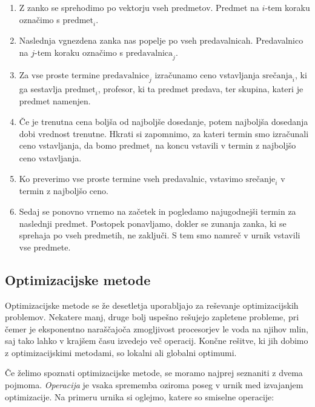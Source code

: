 \documentclass[a4paper,10pt]{article}
\begin{document}
\begin{enumerate}
  \item Z zanko se sprehodimo po vektorju vseh predmetov. Predmet na $i$-tem koraku
   označimo s $\text{predmet}_{i}$.

   \item Naslednja vgnezdena zanka nas popelje po vseh predavalnicah. Predavalnico na
   $j$-tem koraku označimo s $\text{predavalnica}_{j}$.

   \item Za vse proste termine $\text{predavalnice}_{j}$ izračunamo ceno vstavljanja
   $\text{srečanja}_{i}$, ki ga sestavlja $\text{predmet}_{i}$, profesor, ki ta predmet predava,
   ter skupina, kateri je predmet namenjen.

   \item Če je trenutna cena boljša od najboljše dosedanje, potem najboljša dosedanja
   dobi vrednost trenutne. Hkrati si zapomnimo, za kateri termin smo izračunali ceno
   vstavljanja, da bomo $\text{predmet}_{i}$ na koncu vstavili v termin z najboljšo
   ceno vstavljanja.

   \item Ko preverimo vse proste termine vseh predavalnic, vstavimo $\text{srečanje}_{i}$
   v termin z najboljšo ceno.

   \item Sedaj se ponovno vrnemo na začetek in pogledamo najugodnejši termin za naslednji
   predmet. Postopek ponavljamo, dokler se zunanja zanka, ki se sprehaja po vseh predmetih,
   ne zaključi. S tem smo namreč v urnik vstavili vse predmete.
\end{enumerate}

\subsection{Optimizacijske metode} %

Optimizacijske metode se že desetletja uporabljajo za reševanje optimizacijskih problemov.
Nekatere manj, druge bolj uspešno rešujejo zapletene probleme, pri čemer je eksponentno
naraščajoča zmogljivost procesorjev le voda na njihov mlin, saj tako lahko v krajšem
času izvedejo več operacij. Končne rešitve, ki jih dobimo z optimizacijskimi metodami,
so lokalni ali globalni optimumi.

Če želimo spoznati optimizacijske metode, se moramo najprej seznaniti z dvema pojmoma.
\emph{Operacija} je vsaka sprememba oziroma poseg v urnik med izvajanjem optimizacije.
Na primeru urnika si oglejmo, katere so smiselne operacije:
\end{document}
